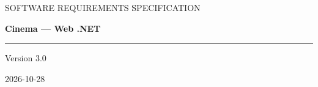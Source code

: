 \documentclass[11pt,a4paper,oneside]{article}
\begin{document}
\begin{titlepage}
\centering
\vspace*{32mm}
{\Large\sffamily\color{SRSlate}SOFTWARE REQUIREMENTS SPECIFICATION\par}
\vspace{14mm}
{\Huge\bfseries\color{SRSlate}Cinema — Web .NET\par}
\vspace{12mm}
{\color{SRSRule}\rule{.72\textwidth}{.7pt}\par}
\vfill
{\large Version 3.0\par}
\vspace{4mm}
{\large 2026-10-28\par}
\vspace{20mm}
\end{titlepage}


\clearpage
\tableofcontents
\clearpage
\listoftables
\clearpage
{}




























\end{document}
